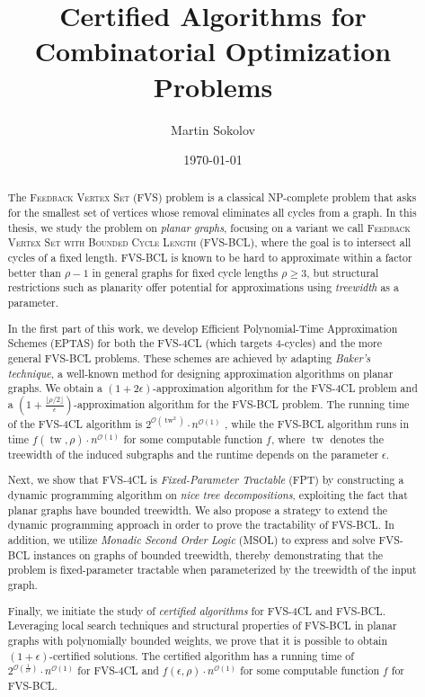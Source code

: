 \documentclass[12pt]{article}
\title{\huge Certified Algorithms for Combinatorial Optimization Problems}
\author{\Large Martin Sokolov}
\date{\today}
\newcommand{\tw}{\operatorname{tw}}
\begin{document}
\maketitle

\begin{abstract}
The \textsc{Feedback Vertex Set} (FVS) problem is a classical NP-complete problem that asks 
for the smallest set of vertices whose removal eliminates all cycles from a graph. 
In this thesis, we study the problem on \emph{planar graphs}, focusing on a variant we call 
\textsc{Feedback Vertex Set with Bounded Cycle Length} (\textsc{FVS-BCL}), where the goal is to 
intersect all cycles of a fixed length. FVS-BCL is known to be hard to approximate within a 
factor better than \( \rho - 1 \) in general graphs for fixed cycle lengths \( \rho \geq 3 \), but 
structural restrictions such as planarity offer potential for approximations using \emph{treewidth} as 
a parameter. 

In the first part of this work, we develop Efficient Polynomial-Time Approximation Schemes 
(EPTAS) for both the FVS-4CL (which targets 4-cycles) and the more general FVS-BCL problems. 
These schemes are achieved by adapting \emph{Baker's technique}, 
a well-known method for designing approximation algorithms on planar graphs. 
We obtain a \((1 + 2\epsilon)\)-approximation algorithm for the FVS-4CL 
problem and a \(\left(1 + \frac{\lfloor\rho/2\rfloor}{\epsilon}\right)\)-approximation algorithm for the 
FVS-BCL problem. 
The running time of the FVS-4CL algorithm is 
\( 2^{\mathcal{O}\left(\tw^{2}\right)} \cdot n^{\mathcal{O}\left(1\right)} \)
, while the FVS-BCL algorithm runs in time 
\( f\left(\tw, \rho\right) \cdot n^{\mathcal{O}\left(1\right)} \) for some computable function 
\( f \), where \( \tw \) denotes the treewidth of the induced subgraphs and the runtime depends 
on the parameter \( \epsilon \).


Next, we show that FVS-4CL is \emph{Fixed-Parameter Tractable} (\textsc{FPT}) by constructing a dynamic 
programming algorithm on \emph{nice tree decompositions}, exploiting the fact that planar graphs 
have bounded treewidth. We also propose a strategy to extend the dynamic programming approach 
in order to prove the tractability of FVS-BCL.
In addition, we utilize \emph{Monadic Second Order Logic} (MSOL) to express and solve FVS-BCL 
instances on graphs of bounded treewidth, thereby demonstrating that the problem is fixed-parameter 
tractable when parameterized by the treewidth of the input graph.

Finally, we initiate the study of \emph{certified algorithms} for FVS-4CL and FVS-BCL. 
Leveraging local search techniques and structural properties of FVS-BCL in planar graphs with polynomially 
bounded weights, we prove that it is possible to obtain \((1 + \epsilon)\)-certified solutions. 
The certified algorithm has a running time of 
\( 2^{\mathcal{O}\left(\frac{1}{\epsilon^2}\right)} \cdot n^{\mathcal{O}(1)} \) 
for FVS-4CL and 
\( f\left(\epsilon, \rho\right) \cdot n^{\mathcal{O}\left(1\right)} \) for some 
computable function \( f \) for FVS-BCL.

\end{abstract}
\end{document}
